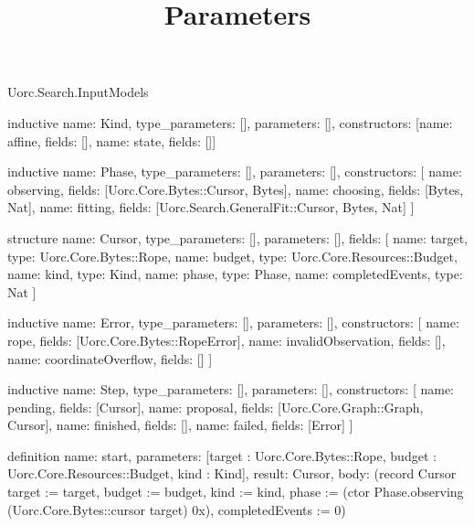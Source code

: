 \begin{lexlean}{Uorc.Search.InputModels}
\title{Parameters}
\begin{semanticmodule}
inductive{
  name: Kind,
  type_parameters: [],
  parameters: [],
  constructors: [{name: affine, fields: []}, {name: state, fields: []}]
}

inductive{
  name: Phase,
  type_parameters: [],
  parameters: [],
  constructors: [
    {name: observing, fields: [Uorc.Core.Bytes::Cursor, Bytes]},
    {name: choosing, fields: [Bytes, Nat]},
    {name: fitting, fields: [Uorc.Search.GeneralFit::Cursor, Bytes, Nat]}
  ]
}

structure{
  name: Cursor,
  type_parameters: [],
  parameters: [],
  fields: [
    {name: target, type: Uorc.Core.Bytes::Rope},
    {name: budget, type: Uorc.Core.Resources::Budget},
    {name: kind, type: Kind},
    {name: phase, type: Phase},
    {name: completedEvents, type: Nat}
  ]
}

inductive{
  name: Error,
  type_parameters: [],
  parameters: [],
  constructors: [
    {name: rope, fields: [Uorc.Core.Bytes::RopeError]},
    {name: invalidObservation, fields: []},
    {name: coordinateOverflow, fields: []}
  ]
}

inductive{
  name: Step,
  type_parameters: [],
  parameters: [],
  constructors: [
    {name: pending, fields: [Cursor]},
    {name: proposal, fields: [Uorc.Core.Graph::Graph, Cursor]},
    {name: finished, fields: []},
    {name: failed, fields: [Error]}
  ]
}

definition{
  name: start,
  parameters: [target : Uorc.Core.Bytes::Rope, budget : Uorc.Core.Resources::Budget, kind : Kind],
  result: Cursor,
  body: (record Cursor {target := target, budget := budget, kind := kind, phase := (ctor Phase.observing (Uorc.Core.Bytes::cursor target) 0x), completedEvents := 0})
}


\end{semanticmodule}
\end{lexlean}
